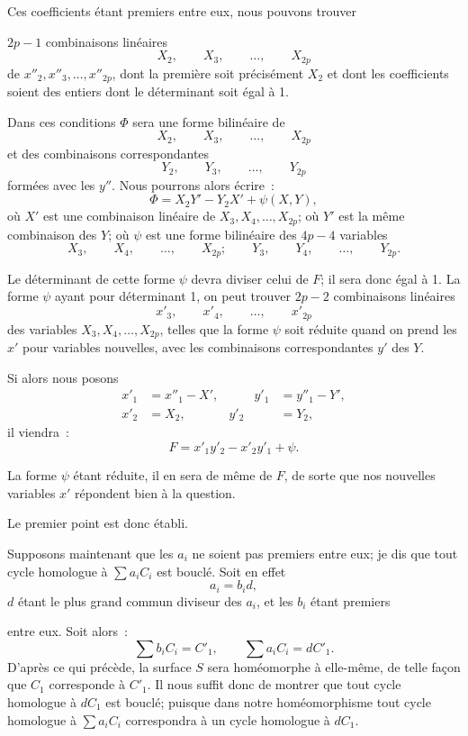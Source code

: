 \documentclass{article}
\begin{document}
Ces coefficients étant premiers entre eux, nous pouvons trouver

$2p - 1$ combinaisons linéaires
\[ X_{2}, \qquad X_{3}, \qquad \ldots, \qquad X_{2p} \]
de $x''_{2}, x''_{3}, \ldots, x''_{2p}$, dont la première soit précisément $X_{2}$ et dont les coefficients soient des entiers dont le déterminant soit égal à 1.

Dans ces conditions $\Phi$ sera une forme bilinéaire de
\[ X_{2}, \qquad X_{3}, \qquad \ldots, \qquad X_{2p} \]
et des combinaisons correspondantes
\[ Y_{2}, \qquad Y_{3}, \qquad \ldots, \qquad Y_{2p} \]
formées avec les $y''$. Nous pourrons alors écrire~:
\[ \Phi = X_{2} Y' - Y_{2} X' + \psi(X, Y), \]
où $X'$ est une combinaison linéaire de $X_{3}, X_{4}, \ldots, X_{2p}$; où $Y'$ est la même combinaison des $Y$; où $\psi$ est une forme bilinéaire des $4p - 4$ variables
\[ X_{3}, \qquad X_{4}, \qquad \ldots, \qquad X_{2p}; \qquad Y_{3}, \qquad Y_{4}, \qquad \ldots, \qquad Y_{2p}. \]

Le déterminant de cette forme $\psi$ devra diviser celui de $F$; il sera donc égal à 1. La forme $\psi$ ayant pour déterminant 1, on peut trouver $2p - 2$ combinaisons linéaires
\[ x'_{3}, \qquad x'_{4}, \qquad \ldots, \qquad x'_{2p} \]
des variables $X_{3}, X_{4}, \ldots, X_{2p}$, telles que la forme $\psi$ soit réduite quand on prend les $x'$ pour variables nouvelles, avec les combinaisons correspondantes $y'$ des $Y$.

Si alors nous posons
\[ \begin{aligned} x'_{1} &= x''_{1} - X', &\qquad y'_{1} &= y''_{1} - Y', \\ x'_{2} &= X_{2}, & y'_{2} &= Y_{2}, \end{aligned} \]
il viendra~:
\[ F = x'_{1}y'_{2} - x'_{2}y'_{1} + \psi. \]

La forme $\psi$ étant réduite, il en sera de même de $F$, de sorte que nos nouvelles variables $x'$ répondent bien à la question.

Le premier point est donc établi.

Supposons maintenant que les $a_{i}$ ne soient pas premiers entre eux; je dis que tout cycle homologue à $\displaystyle\sum a_{i} C_{i}$ est bouclé. Soit en effet
\[ a_{i} = b_{i} d, \]
$d$ étant le plus grand commun diviseur des $a_{i}$, et les $b_{i}$ étant premiers

entre eux. Soit alors~:
\[ \sum b_{i} C_{i} = C'_{1}, \qquad \sum a_{i} C_{i} = dC'_{1}. \]
D'après ce qui précède, la surface $S$ sera homéomorphe à elle-même, de telle façon que $C_{1}$ corresponde à $C'_{1}$. Il nous suffit donc de montrer que tout cycle homologue à $dC_{1}$ est bouclé; puisque dans notre homéomorphisme tout cycle homologue à $\displaystyle\sum a_{i} C_{i}$ correspondra à un cycle homologue à $dC_{1}$.
\end{document}
